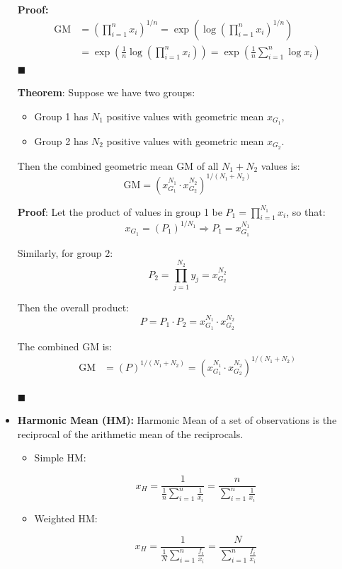 \documentclass[twoside]{book}
\begin{document}
\begin{itemize}
\textbf{Proof:}
\begin{align*}
\mathrm{GM} &= \left( \prod_{i=1}^n x_i \right)^{1/n} = \exp\left( \log \left( \prod_{i=1}^n x_i \right)^{1/n} \right) \\
            &= \exp\left( \frac{1}{n} \log \left( \prod_{i=1}^n x_i \right) \right) = \exp\left( \frac{1}{n} \sum_{i=1}^n \log x_i \right)
\end{align*}
\hfill $\blacksquare$

\begin{textbox}
\textbf{Theorem}: Suppose we have two groups:
\begin{itemize}
  \item Group 1 has \( N_1 \) positive values with geometric mean \( x_{G_1} \),
  \item Group 2 has \( N_2 \) positive values with geometric mean \( x_{G_2} \).
\end{itemize}
Then the combined geometric mean \( \mathrm{GM} \) of all \( N_1 + N_2 \) values is:
\[
\mathrm{GM} = \left( x_{G_1}^{N_1} \cdot x_{G_2}^{N_2} \right)^{1/(N_1 + N_2)}
\]
\end{textbox}

\textbf{Proof}: Let the product of values in group 1 be \( P_1 = \prod_{i=1}^{N_1} x_i \), so that:
\[
x_{G_1} = \left( P_1 \right)^{1/N_1} \Rightarrow P_1 = x_{G_1}^{N_1}
\]

Similarly, for group 2:
\[
P_2 = \prod_{j=1}^{N_2} y_j = x_{G_2}^{N_2}
\]

Then the overall product:
\[
P = P_1 \cdot P_2 = x_{G_1}^{N_1} \cdot x_{G_2}^{N_2}
\]

The combined GM is:
\begin{align*}
\mathrm{GM} &= \left( P \right)^{1/(N_1 + N_2)} = \left( x_{G_1}^{N_1} \cdot x_{G_2}^{N_2} \right)^{1/(N_1 + N_2)}
\end{align*}

\hfill $\blacksquare$

    \item \textbf{Harmonic Mean (HM):} Harmonic Mean of a set of observations is the reciprocal of the arithmetic mean of the reciprocals.
    \begin{itemize}
        \item Simple HM:
        \begin{textbox}
    \[
    x_H = \dfrac{1}{ \frac{1}{n}\sum_{i=1}^{n} \frac{1}{x_i}} = \dfrac{n}{\sum_{i=1}^{n} \frac{1}{x_i}}
    \]
    \end{textbox}
    \item Weighted HM:
    \begin{textbox}
    \[
    x_H = \dfrac{1}{ \frac{1}{N}\sum_{i=1}^{n} \frac{f_i}{x_i}} = \dfrac{N}{\sum_{i=1}^{n} \frac{f_i}{x_i}}
    \]
    \end{textbox}
    \end{itemize}

\end{itemize}
\end{document}
